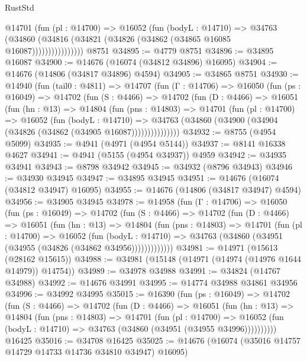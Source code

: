 \begin{lexlean}{RustStd}
\begin{coremodule}
                  @14701
                    (fun (pl : @14700) =>
                    @16052
                      (fun (bodyL : @14710) =>
                      @34763
                        (@34860
                          (@34816 (@34821 (@34826 (@34862 (@34865 @16085 @16087))))))))))))))))
    @8751
@34895 := @4779 @8751
@34896 := @34895 @16087
@34900 := @14676 (@16074 (@34812 @34896) @16095)
@34904 := @14676 (@14806 (@34817 @34896) @4594)
@34905 := @34865 @8751
@34930 := @14940
    (fun (tail0 : @4811) =>
    @14707
      (fun (Γ : @14706) =>
      @16050
        (fun (ps : @16049) =>
        @14702
          (fun (S : @4466) =>
          @14702
            (fun (D : @4466) =>
            @16051
              (fun (hn : @13) =>
              @14804
                (fun (pns : @14803) =>
                @14701
                  (fun (pl : @14700) =>
                  @16052
                    (fun (bodyL : @14710) =>
                    @34763 (@34860 (@34900 (@34904 (@34826 (@34862 (@34905 @16087)))))))))))))))
@34932 := @8755 (@4954 @5099)
@34935 := @4941 (@4971 (@4954 @5144))
@34937 := @8141 @16338 @4627
@34941 := @4941 (@5155 (@4954 @34937)) @4959
@34942 := @34935 @34941
@34943 := @8798 @34942
@34945 := @34932 (@8796 @34943)
@34946 := @34930 @34945
@34947 := @34895 @34945
@34951 := @14676 (@16074 (@34812 @34947) @16095)
@34955 := @14676 (@14806 (@34817 @34947) @4594)
@34956 := @34905 @34945
@34978 := @14958
    (fun (Γ : @14706) =>
    @16050
      (fun (ps : @16049) =>
      @14702
        (fun (S : @4466) =>
        @14702
          (fun (D : @4466) =>
          @16051
            (fun (hn : @13) =>
            @14804
              (fun (pns : @14803) =>
              @14701
                (fun (pl : @14700) =>
                @16052
                  (fun (bodyL : @14710) =>
                  @34763 (@34860 (@34951 (@34955 (@34826 (@34862 @34956)))))))))))))
@34981 := @14971 (@15613 (@28162 @15615))
@34988 := @34981 (@15148 (@14971 (@14974 (@14976 @1644 @14979)) @14754))
@34989 := @34978 @34988
@34991 := @34824 (@14767 @34988)
@34992 := @14676 @34991
@34995 := @14774 @34988 @34861 @34956
@34996 := @34992 @34995
@35015 := @16390
    (fun (ps : @16049) =>
    @14702
      (fun (S : @4466) =>
      @14702
        (fun (D : @4466) =>
        @16051
          (fun (hn : @13) =>
          @14804
            (fun (pns : @14803) =>
            @14701
              (fun (pl : @14700) =>
              @16052 (fun (bodyL : @14710) => @34763 (@34860 (@34951 (@34955 @34996))))))))))
    @16425
@35016 := @34708 @16425
@35025 := @14676 (@16074 (@35016 @14757 @14729 @14733 @14736 @34810 @34947) @16095)

\end{coremodule}
\end{lexlean}

